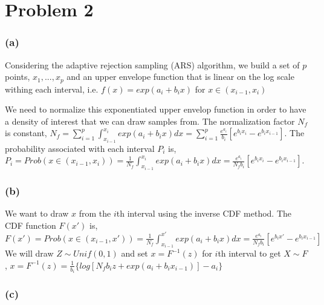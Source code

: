\documentclass{article}
\begin{document}
\section*{Problem 2}

\subsubsection*{(a)}

\hspace{12 pt} Considering the adaptive rejection sampling (ARS) algorithm, we build a set of $p$ points,
$x_1,...,x_p$ and an upper envelope function that is linear on the log scale withing each interval, i.e.
$f(x) = exp(a_i+b_ix)$ for $x\in(x_{i-1},x_i)$

We need to normalize this exponentiated upper envelop function in order to have a density of interest that
we can draw samples from.\newline
The normalization factor $N_f$ is constant,\newline
$N_f = \displaystyle\sum_{i=1}^p \int_{x_{i-1}}^{x_i} exp(a_i+b_ix)dx 
     = \displaystyle\sum_{i=1}^p \frac{e^{a_i}}{b_i}[e^{b_ix_i}-e^{b_ix_{i-1}}]$.\newline
The probability associated with each interval $P_i$ is, \newline
$P_i = Prob(x\in(x_{i-1},x_i)) = \frac{1}{N_f}\displaystyle\int_{x_{i-1}}^{x_i}exp(a_i+b_ix)dx
     = \frac{e^{a_i}}{N_fb_i}[e^{b_ix_i}-e^{b_ix_{i-1}}]$.\newline


\subsubsection*{(b)}

\hspace{12 pt} We want to draw $x$ from the $i$th interval using the inverse CDF method.\newline
The CDF function $F(x')$ is,\newline
$F(x') = Prob(x\in(x_{i-1},x')) = \frac{1}{N_f}\displaystyle\int_{x_{i-1}}^{x'}exp(a_i+b_ix)dx
        = \frac{e^{a_i}}{N_fb_i}[e^{b_ix'}-e^{b_ix_{i-1}}]$\newline
We will draw $Z\sim Unif(0,1)$ and set $x = F^{-1}(z)$ for $i$th interval to get $X\sim F$,\newline
$x = F^{-1}(z) = \frac{1}{b_i} \{\displaystyle log[N_fb_iz + exp(a_i+b_ix_{i-1})] -a_i\}$

\subsubsection*{(c)}
\end{document}
